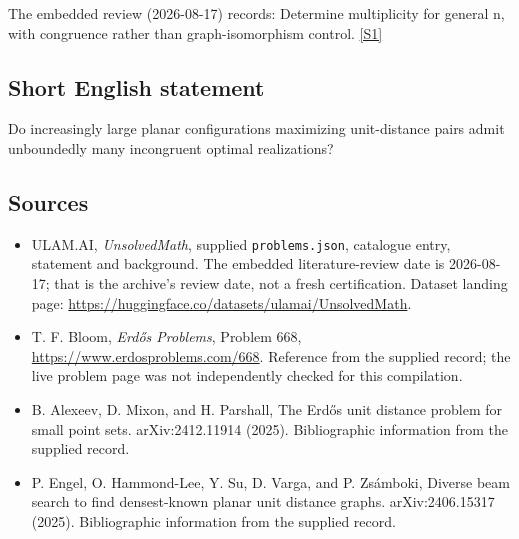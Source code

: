 \documentclass[11pt,a4paper]{article}
\newcommand{\sref}[2]{\hyperlink{source:#1:#2}{[S#2]}}
\begin{document}
The embedded review (2026-08-17) records: Determine multiplicity for general n, with congruence rather than graph-isomorphism control. \sref{statement}{1}

\subsection{Short English statement}

Do increasingly large planar configurations maximizing unit-distance pairs admit unboundedly many incongruent optimal realizations?

\subsection{Sources}

{\small

\begin{itemize}

\item[\hypertarget{source:statement:1}{S1}] ULAM.AI, \emph{UnsolvedMath}, supplied \texttt{problems.json}, catalogue entry, statement and background. The embedded literature-review date is 2026-08-17; that is the archive’s review date, not a fresh certification. Dataset landing page: \url{https://huggingface.co/datasets/ulamai/UnsolvedMath}.

\item[\hypertarget{source:statement:2}{S2}] T. F. Bloom, \emph{Erdős Problems}, Problem 668, \url{https://www.erdosproblems.com/668}. Reference from the supplied record; the live problem page was not independently checked for this compilation.

\item[\hypertarget{source:statement:3}{S3}] B. Alexeev, D. Mixon, and H. Parshall, The Erd\H{o}s unit distance problem for small point sets. arXiv:2412.11914 (2025). Bibliographic information from the supplied record.

\item[\hypertarget{source:statement:4}{S4}] P. Engel, O. Hammond-Lee, Y. Su, D. Varga, and P. Zs\'{a}mboki, Diverse beam search to find densest-known planar unit distance graphs. arXiv:2406.15317 (2025). Bibliographic information from the supplied record.

\end{itemize}

}

\label{end:statement}
\end{document}

